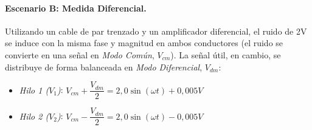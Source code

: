 \paragraph{Escenario B: Medida Diferencial.}
Utilizando un cable de par trenzado y un amplificador diferencial, el ruido de \unit{2}{V} se induce con la misma fase y magnitud en ambos conductores (el ruido se convierte en una señal en \emph{Modo Común}, $V_{cm}$). La señal útil, en cambio, se distribuye de forma balanceada en \emph{Modo Diferencial}, $V_{dm}$:
\begin{itemize}
    \item \emph{Hilo 1 ($V_1$)}: $V_{cm} + \dfrac{V_{dm}}{2} = 2,0 \sin(\omega t) + \unit{0,005}{V}$
    \item \emph{Hilo 2 ($V_2$)}: $V_{cm} - \dfrac{V_{dm}}{2} = 2,0 \sin(\omega t) - \unit{0,005}{V}$
\end{itemize}

